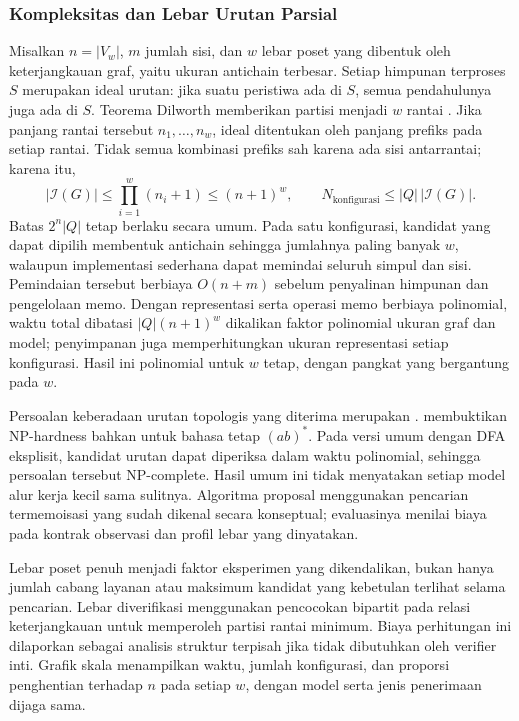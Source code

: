 \subsubsection{Kompleksitas dan Lebar Urutan Parsial}
\label{sec:complexity}
Misalkan $n=|V_w|$, $m$ jumlah sisi, dan $w$ lebar poset yang dibentuk oleh keterjangkauan graf, yaitu ukuran antichain terbesar. Setiap himpunan terproses $S$ merupakan ideal urutan: jika suatu peristiwa ada di $S$, semua pendahulunya juga ada di $S$. Teorema Dilworth memberikan partisi menjadi $w$ rantai \citep{dilworth1950}. Jika panjang rantai tersebut $n_1,\ldots,n_w$, ideal ditentukan oleh panjang prefiks pada setiap rantai. Tidak semua kombinasi prefiks sah karena ada sisi antarrantai; karena itu,
\begin{equation}
  |\mathcal{I}(G)|\leq\prod_{i=1}^{w}(n_i+1)\leq(n+1)^w,
  \qquad N_{\mathrm{konfigurasi}}\leq|Q|\,|\mathcal{I}(G)|.
\end{equation}
Batas $2^n|Q|$ tetap berlaku secara umum. Pada satu konfigurasi, kandidat yang dapat dipilih membentuk antichain sehingga jumlahnya paling banyak $w$, walaupun implementasi sederhana dapat memindai seluruh simpul dan sisi. Pemindaian tersebut berbiaya $O(n+m)$ sebelum penyalinan himpunan dan pengelolaan memo. Dengan representasi serta operasi memo berbiaya polinomial, waktu total dibatasi $|Q|(n+1)^w$ dikalikan faktor polinomial ukuran graf dan model; penyimpanan juga memperhitungkan ukuran representasi setiap konfigurasi. Hasil ini polinomial untuk $w$ tetap, dengan pangkat yang bergantung pada $w$.

Persoalan keberadaan urutan topologis yang diterima merupakan . \citet{amarilli2018} membuktikan NP-hardness bahkan untuk bahasa tetap $(ab)^*$. Pada versi umum dengan DFA eksplisit, kandidat urutan dapat diperiksa dalam waktu polinomial, sehingga persoalan tersebut NP-complete. Hasil umum ini tidak menyatakan setiap model alur kerja kecil sama sulitnya. Algoritma proposal menggunakan pencarian termemoisasi yang sudah dikenal secara konseptual; evaluasinya menilai biaya pada kontrak observasi dan profil lebar yang dinyatakan.

Lebar poset penuh menjadi faktor eksperimen yang dikendalikan, bukan hanya jumlah cabang layanan atau maksimum kandidat yang kebetulan terlihat selama pencarian. Lebar diverifikasi menggunakan pencocokan bipartit pada relasi keterjangkauan untuk memperoleh partisi rantai minimum. Biaya perhitungan ini dilaporkan sebagai analisis struktur terpisah jika tidak dibutuhkan oleh verifier inti. Grafik skala menampilkan waktu, jumlah konfigurasi, dan proporsi penghentian terhadap $n$ pada setiap $w$, dengan model serta jenis penerimaan dijaga sama.


